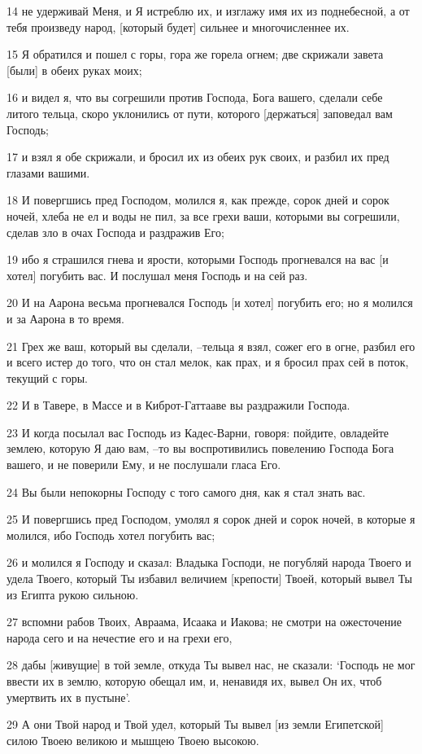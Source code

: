 \par 14 не удерживай Меня, и Я истреблю их, и изглажу имя их из поднебесной, а от тебя произведу народ, [который будет] сильнее и многочисленнее их.
\par 15 Я обратился и пошел с горы, гора же горела огнем; две скрижали завета [были] в обеих руках моих;
\par 16 и видел я, что вы согрешили против Господа, Бога вашего, сделали себе литого тельца, скоро уклонились от пути, которого [держаться] заповедал вам Господь;
\par 17 и взял я обе скрижали, и бросил их из обеих рук своих, и разбил их пред глазами вашими.
\par 18 И повергшись пред Господом, молился я, как прежде, сорок дней и сорок ночей, хлеба не ел и воды не пил, за все грехи ваши, которыми вы согрешили, сделав зло в очах Господа и раздражив Его;
\par 19 ибо я страшился гнева и ярости, которыми Господь прогневался на вас [и хотел] погубить вас. И послушал меня Господь и на сей раз.
\par 20 И на Аарона весьма прогневался Господь [и хотел] погубить его; но я молился и за Аарона в то время.
\par 21 Грех же ваш, который вы сделали, --тельца я взял, сожег его в огне, разбил его и всего истер до того, что он стал мелок, как прах, и я бросил прах сей в поток, текущий с горы.
\par 22 И в Тавере, в Массе и в Киброт-Гаттааве вы раздражили Господа.
\par 23 И когда посылал вас Господь из Кадес-Варни, говоря: пойдите, овладейте землею, которую Я даю вам, --то вы воспротивились повелению Господа Бога вашего, и не поверили Ему, и не послушали гласа Его.
\par 24 Вы были непокорны Господу с того самого дня, как я стал знать вас.
\par 25 И повергшись пред Господом, умолял я сорок дней и сорок ночей, в которые я молился, ибо Господь хотел погубить вас;
\par 26 и молился я Господу и сказал: Владыка Господи, не погубляй народа Твоего и удела Твоего, который Ты избавил величием [крепости] Твоей, который вывел Ты из Египта рукою сильною.
\par 27 вспомни рабов Твоих, Авраама, Исаака и Иакова; не смотри на ожесточение народа сего и на нечестие его и на грехи его,
\par 28 дабы [живущие] в той земле, откуда Ты вывел нас, не сказали: `Господь не мог ввести их в землю, которую обещал им, и, ненавидя их, вывел Он их, чтоб умертвить их в пустыне'.
\par 29 А они Твой народ и Твой удел, который Ты вывел [из земли Египетской] силою Твоею великою и мышцею Твоею высокою.

